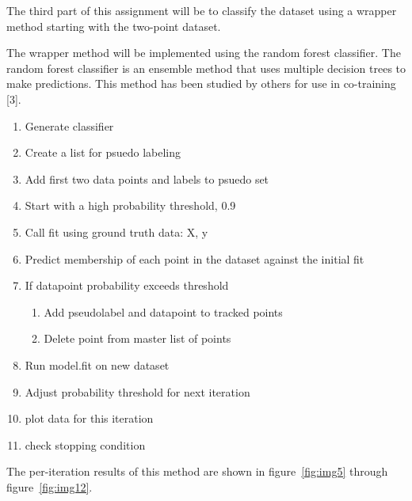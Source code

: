 
The third part of this assignment will be to classify the dataset using a wrapper method starting with the two-point dataset.

The wrapper method will be implemented using the random forest classifier. The random forest classifier is an ensemble method that uses multiple decision trees to make predictions. This method has been studied by others for use in co-training [3].\par

\begin{tcolorbox}[breakable, title={Pseudocode for Wrapper Method for Semi-Supervised Learning}]
    \footnotesize     
    \begin{enumerate}
        \item Generate classifier
        \item Create a list for psuedo labeling
        \item Add first two data points and labels to psuedo set
        \item Start with a high probability threshold, 0.9
        \item Call fit using ground truth data: X, y
        \item Predict membership of each point in the dataset against the initial fit
        \item If datapoint probability exceeds threshold
        \begin{enumerate}
            \item Add pseudolabel and datapoint to tracked points
            \item Delete point from master list of points
        \end{enumerate}
        \item Run model.fit on new dataset
        \item Adjust probability threshold for next iteration
        \item plot data for this iteration
        \item check stopping condition
    \end{enumerate}
\end{tcolorbox}
\normalsize

The per-iteration results of this method are shown in figure~\ref{fig:img5} through figure~\ref{fig:img12}. 